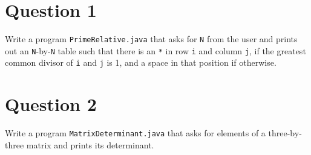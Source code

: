 \documentclass[12pt,letterpaper,twoside]{article}
\begin{document}


\section*{Question 1}

Write a program \texttt{PrimeRelative.java} that asks for \texttt{N} from the user and prints out an \texttt{N}-by-\texttt{N} table such that there is an \texttt{*} in row \texttt{i} and column \texttt{j}, if the greatest common divisor of \texttt{i} and \texttt{j} is 1, and a space in that position if otherwise.

\section*{Question 2}

Write a program \texttt{MatrixDeterminant.java} that asks for elements of a three-by-three matrix and prints its determinant.

\end{document}
